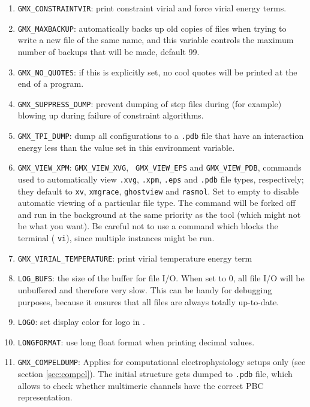 \begin{enumerate}

\item   {\tt GMX_CONSTRAINTVIR}: print constraint virial and force virial energy terms.
\item   {\tt GMX_MAXBACKUP}: {\gromacs} automatically backs up old
        copies of files when trying to write a new file of the same
        name, and this variable controls the maximum number of
        backups that will be made, default 99.
\item   {\tt GMX_NO_QUOTES}: if this is explicitly set, no cool quotes
        will be printed at the end of a program.
\item   {\tt GMX_SUPPRESS_DUMP}: prevent dumping of step files during
        (for example) blowing up during failure of constraint
        algorithms.
\item   {\tt GMX_TPI_DUMP}: dump all configurations to a {\tt .pdb}
        file that have an interaction energy less than the value set
        in this environment variable.
\item   {\tt GMX_VIEW_XPM}: {\tt GMX_VIEW_XVG}, {\tt
        GMX_VIEW_EPS} and {\tt GMX_VIEW_PDB}, commands used to
        automatically view \@ {\tt .xvg}, {\tt .xpm}, {\tt .eps}
        and {\tt .pdb} file types, respectively; they default to {\tt xv}, {\tt xmgrace},
        {\tt ghostview} and {\tt rasmol}. Set to empty to disable
        automatic viewing of a particular file type. The command will
        be forked off and run in the background at the same priority
        as the {\gromacs} tool (which might not be what you want).
        Be careful not to use a command which blocks the terminal
        ({\eg} {\tt vi}), since multiple instances might be run.
\item   {\tt GMX_VIRIAL_TEMPERATURE}: print virial temperature energy term
\item   {\tt LOG_BUFS}: the size of the buffer for file I/O. When set
        to 0, all file I/O will be unbuffered and therefore very slow.
        This can be handy for debugging purposes, because it ensures
        that all files are always totally up-to-date.
\item   {\tt LOGO}: set display color for logo in {\tt {}}.
\item   {\tt LONGFORMAT}: use long float format when printing
        decimal values.
\item   {\tt GMX_COMPELDUMP}: Applies for computational electrophysiology setups
        only (see section \ref{sec:compel}). The initial structure gets dumped to 
        {\tt .pdb} file, which allows to check whether multimeric channels have 
        the correct PBC representation. 
\end{enumerate}


